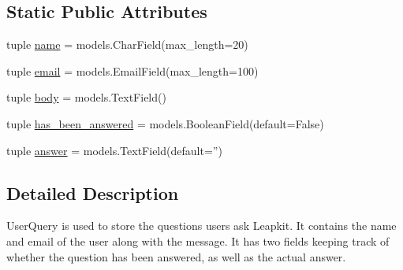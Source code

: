 \subsection*{Static Public Attributes}
\begin{DoxyCompactItemize}
\item 
tuple \hyperlink{classqueries_1_1models_1_1_user_question_aa0415c4eaa474d4cecbd7909e47aa6c0}{name} = models.\-Char\-Field(max\-\_\-length=20)
\item 
tuple \hyperlink{classqueries_1_1models_1_1_user_question_aa65cfbbd47d6b13efee75d428d370029}{email} = models.\-Email\-Field(max\-\_\-length=100)
\item 
tuple \hyperlink{classqueries_1_1models_1_1_user_question_a82c29d9cf27cf5c3f5bea740c509177a}{body} = models.\-Text\-Field()
\item 
tuple \hyperlink{classqueries_1_1models_1_1_user_question_a153e1ff87e262858b13ae88e4338448d}{has\-\_\-been\-\_\-answered} = models.\-Boolean\-Field(default=False)
\item 
tuple \hyperlink{classqueries_1_1models_1_1_user_question_a60bb4d98ce60f2b003a8aede96f10ed9}{answer} = models.\-Text\-Field(default='')
\end{DoxyCompactItemize}


\subsection{Detailed Description}
\begin{DoxyVerb}UserQuery is used to store the questions users ask Leapkit.
It contains the name and email of the user along with the message.
It has two fields keeping track of whether the question has been answered, as well as the actual answer.
\end{DoxyVerb}
 

